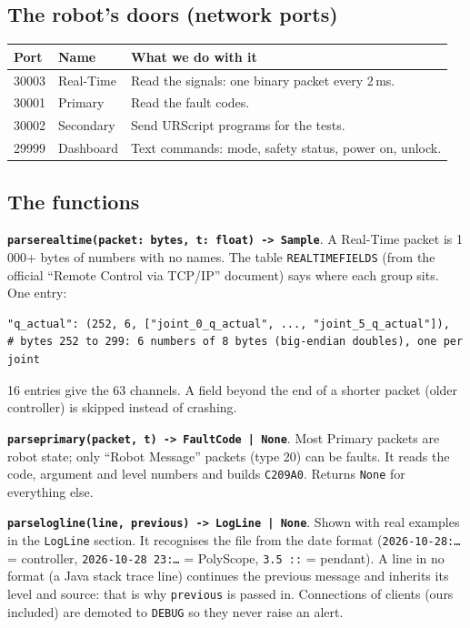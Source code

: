 \documentclass[10pt]{article}
\newcommand{\brkus}{\textunderscore\allowbreak}
\newcommand{\f}[1]{\texttt{\let\_\brkus #1}}
\begin{document}
\subsection{The robot's doors (network ports)}
\begin{center}\small
\begin{tabularx}{\linewidth}{@{}l l X@{}}
\toprule
\textbf{Port} & \textbf{Name} & \textbf{What we do with it} \\
\midrule
30003 & Real-Time & Read the signals: one binary packet every 2\,ms. \\
30001 & Primary & Read the fault codes. \\
30002 & Secondary & Send URScript programs for the tests. \\
29999 & Dashboard & Text commands: mode, safety status, power on, unlock. \\
\bottomrule
\end{tabularx}
\end{center}

\subsection{The functions}
\textbf{\f{parse\_realtime(packet: bytes, t: float) -> Sample}}. A Real-Time packet is 1\,000+
bytes of numbers with no names. The table \f{REALTIME\_FIELDS} (from the official ``Remote Control
via TCP/IP'' document) says where each group sits. One entry:
\begin{lstlisting}
"q_actual": (252, 6, ["joint_0_q_actual", ..., "joint_5_q_actual"]),
# bytes 252 to 299: 6 numbers of 8 bytes (big-endian doubles), one per joint
\end{lstlisting}
16 entries give the 63 channels. A field beyond the end of a shorter packet (older controller)
is skipped instead of crashing.

\textbf{\f{parse\_primary(packet, t) -> FaultCode | None}}. Most Primary packets are robot
state; only ``Robot Message'' packets (type 20) can be faults. It reads the code, argument and
level numbers and builds \f{C209A0}. Returns \f{None} for everything else.

\textbf{\f{parse\_log\_line(line, previous) -> LogLine | None}}. Shown with real examples in the
\f{LogLine} section. It recognises the file from the date format (\f{2026-10-28\_23:\ldots} =
controller, \f{2026-10-28 23:\ldots} = PolyScope, \f{3.5 ::} = pendant). A line in no format
(a Java stack trace line) continues the previous message and inherits its level and source:
that is why \f{previous} is passed in. Connections of clients (ours included) are demoted to
\f{DEBUG} so they never raise an alert.
\end{document}
